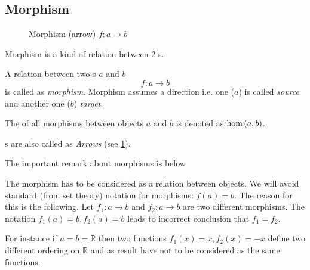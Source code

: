 \subsection{Morphism}

\begin{figure}
  \centering
  \caption{Morphism (arrow) $f: a \to b $}
  \label{fig:morphism}
\end{figure}


Morphism is a kind of relation between 2 s. 
\begin{definition}[Morphism]
  \label{def:morphism}
  A relation between two s $a$ and $b$ 
  \[
  f: a \rightarrow b
  \]
  is called as \textit{morphism}. Morphism assumes a direction i.e. one
  ($a$) is called \textit{source} and another one ($b$)
  \textit{target}.

  The  of all morphisms between objects $a$ and $b$
  is denoted as $\catmset{a}{b}$.
\end{definition}

\begin{definition}[Arrow]
  \label{def:arrow}
  s are also called as \textit{Arrows} (see
  \cref{fig:morphism}). 
\end{definition}

The important remark about morphisms is below
\begin{remark}[Morphism]
\label{rem:morphism}
The morphism has to be considered as a relation between objects. We
will avoid standard (from set theory) notation for morphisms: $f(a) =
b$. The reason for this is the following. Let $f_1: a \to b$ and $f_2:
a \to b$ are two different morphisms. The notation $f_1(a) = b, f_2(a) =
b$ leads to incorrect conclusion that $f_1 = f_2$. 

For instance if $a
= b = \mathbb{R}$ then two functions $f_1(x) = x, f_2(x) = -x$ define two
different ordering on $\mathbb{R}$ and as result have not to be
considered as the same functions.
\end{remark}

